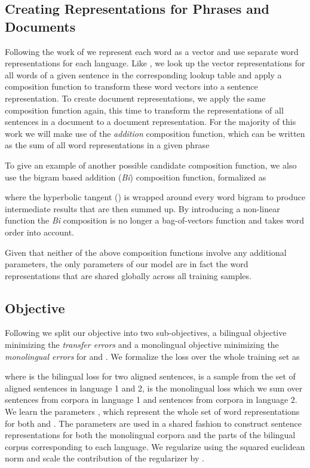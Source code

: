 \documentclass{article} \usepackage{iclr2015,times}
\begin{document}
\subsection{Creating Representations for Phrases and Documents}

Following the work of
\citet{klementiev2012inducing,hermann2014multilingual,gouws2014bilbowa}
we represent each word as a vector and use separate word representations for
each language.
Like \citet{hermann2014multilingual}, we look up the vector representations
for all words of a given sentence in the corresponding lookup table and apply 
a composition function to transform these word vectors into 
a sentence representation.
To create document representations, we apply the same composition function
again, this time to transform the representations of all sentences in a
document to a document representation.
For the majority of this work we will make use of the \emph{addition}
composition function, which can be written as the sum of all word 
representations  in a given phrase


To give an example of another possible candidate composition function,
we also use the bigram based addition (\emph{Bi}) composition function,
formalized as

where the hyperbolic tangent () is wrapped around every word bigram
to produce intermediate results that are then summed up.
By introducing a non-linear function the \emph{Bi} composition
is no longer a bag-of-vectors function and takes word order into account.

Given that neither of the above composition functions involve any additional
parameters, the only parameters of our model are in fact
the word representations that are shared globally across all training samples.

\subsection{Objective}

Following \citet{klementiev2012inducing} we split our objective into two
sub-objectives, a bilingual objective minimizing the \emph{transfer errors} and
a monolingual objective minimizing the \emph{monolingual errors} for  and
. We formalize the loss over the whole training set as

where  is the bilingual loss for two aligned sentences,  is a 
sample from the set of  aligned sentences in language 1 and 2,
 is the monolingual loss which we sum over  sentences
 from corpora in language 1 and  sentences 
from corpora in language 2. We learn the parameters , which 
represent the whole set of word representations for both  and .
The parameters are used in a shared fashion to construct sentence 
representations for both the monolingual corpora and the parts of the 
bilingual corpus corresponding to each language.
We regularize  using the squared euclidean norm and scale the
contribution of the regularizer by .
\end{document}
